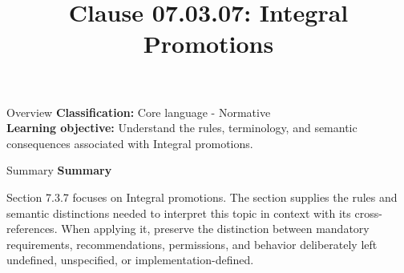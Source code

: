\documentclass[10pt,letterpaper]{article}
\title{Clause 07.03.07: Integral Promotions}
\author{}
\date{}
\begin{document}
\maketitle
\begin{CornellOverviewBox}{Overview}
\textbf{Classification:} Core language - Normative\\[2pt]
\textbf{Learning objective:} Understand the rules, terminology, and semantic consequences associated with Integral promotions.
\end{CornellOverviewBox}\begin{CornellSummaryBox}{Summary}
{\sffamily\bfseries\color{Accent} Summary}\par\vspace{3pt}Section 7.3.7 focuses on Integral promotions. The section supplies the rules and semantic distinctions needed to interpret this topic in context with its cross-references. When applying it, preserve the distinction between mandatory requirements, recommendations, permissions, and behavior deliberately left undefined, unspecified, or implementation-defined.
\end{CornellSummaryBox}
\end{document}
